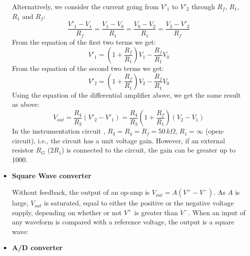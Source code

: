 \documentclass{article}
\begin{document}
\begin{itemize}
  Alternatively, we consider the current going from $V'_1$ to $V'_2$
  through $R_f$, $R_1$, $R_1$ and $R_f$:
  \begin{equation}
    \frac{V'_1-V_1}{R_f}=\frac{V_1-V_0}{R_1}=\frac{V_0-V_2}{R_1}
    =\frac{V_2-V'_2}{R_f} 
  \end{equation}
  From the equation of the first two terms we get:
  \begin{equation}
    V'_1=\left(1+\frac{R_f}{R_1}\right)V_1-\frac{R_f}{R_1}V_0 
  \end{equation}
  From the equation of the second two terms we get:
  \begin{equation}
    V'_2=\left(1+\frac{R_f}{R_1}\right)V_2-\frac{R_f}{R_1}V_0 
  \end{equation}
  Using the equation of the differential amplifier above, we get the
  same result as above:
  \begin{equation}
    V_{out}=\frac{R_4}{R_3}(V'_2-V'_1)
    =\frac{R_4}{R_3}\left(1+\frac{R_f}{R_1}\right)(V_2-V_1) 
  \end{equation}
  In the instrumentation circuit 
  ,
  $R_3=R_4=R_f=50\,k\Omega$, $R_1=\infty$ (open-circuit), i.e., the 
  circuit has a unit voltage gain. However, if an external resistor 
  $R_G$ ($2R_1$) is connected to the circuit, the gain can be greater 
  up to 1000.
  




\item {\bf Square Wave converter}

  Without feedback, the output of an op-amp is $V_{out}=A(V^+-V^-)$. As $A$ is
  large, $V_{out}$ is saturated, equal to either the positive or the negative
  voltage supply, depending on whether or not $V^+$ is greater than $V^-$. 
  When an input of any waveform is compared with a reference voltage, the
  output is a square wave:



\item {\bf A/D converter}


\end{itemize}
\end{document}
